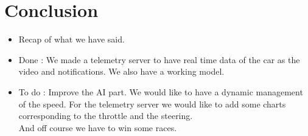 \documentclass[11pt]{article}
\begin{document}
\section {Conclusion}

\begin{itemize}
\item Recap of what we have said.
\item Done : We made a telemetry server to have real time data of the car as the video and notifications. We also have a working model.

\item To do : Improve the AI part. We would like to have a dynamic management of the speed. For the telemetry server we would like to add some charts corresponding to the throttle and the steering. \\
And off course we have to win some races.

\end{itemize}
\end{document}
